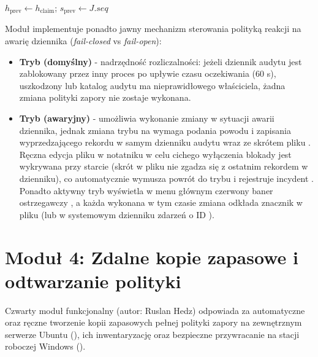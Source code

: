 \begin{algorithm}[H]
{        
        $h_{\text{prev}} \leftarrow h_{\text{claim}}$; $s_{\text{prev}} \leftarrow J.\mathit{seq}$\;
    }
    \;
\end{algorithm}

Moduł implementuje ponadto jawny mechanizm sterowania polityką reakcji na awarię dziennika (\textit{fail-closed} vs \textit{fail-open}):
\begin{itemize}
    \item \textbf{Tryb  (domyślny)} - nadrzędność rozliczalności: jeżeli dziennik audytu jest zablokowany przez inny proces po upływie czasu oczekiwania (60 s), uszkodzony lub katalog audytu ma nieprawidłowego właściciela, żadna zmiana polityki zapory nie zostaje wykonana.
    \item \textbf{Tryb  (awaryjny)} - umożliwia wykonanie zmiany w sytuacji awarii dziennika, jednak zmiana trybu na  wymaga podania powodu i zapisania wyprzedzającego rekordu  w samym dzienniku audytu wraz ze skrótem pliku . Ręczna edycja pliku  w notatniku w celu cichego wyłączenia blokady jest wykrywana przy starcie (skrót w pliku nie zgadza się z ostatnim rekordem  w dzienniku), co automatycznie wymusza powrót do trybu  i rejestruje incydent . Ponadto aktywny tryb  wyświetla w menu głównym czerwony baner ostrzegawczy , a każda wykonana w tym czasie zmiana odkłada znacznik w pliku  (lub w systemowym dzienniku zdarzeń  o ID ).
\end{itemize}

\section{Moduł 4: Zdalne kopie zapasowe i odtwarzanie polityki}\label{sec:modul-backup}

Czwarty moduł funkcjonalny (autor: Ruslan Hedz) odpowiada za automatyczne oraz ręczne tworzenie kopii zapasowych pełnej polityki zapory na zewnętrznym serwerze Ubuntu (), ich inwentaryzację oraz bezpieczne przywracanie na stacji roboczej Windows ().

